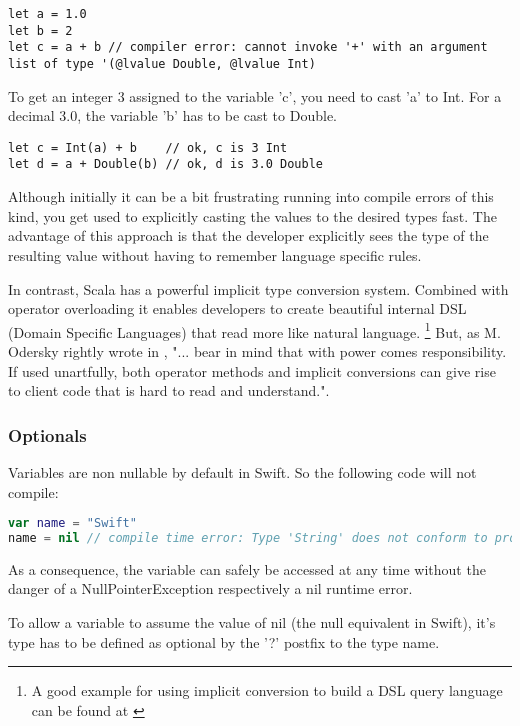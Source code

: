 \begin{lstlisting}[frame=none]
let a = 1.0
let b = 2
let c = a + b // compiler error: cannot invoke '+' with an argument list of type '(@lvalue Double, @lvalue Int)
\end{lstlisting}

To get an integer 3 assigned to the variable 'c', you need to cast 'a' to Int. For a decimal 3.0, the variable 'b' has to be cast to Double.

\begin{lstlisting}[frame=none]
let c = Int(a) + b    // ok, c is 3 Int
let d = a + Double(b) // ok, d is 3.0 Double
\end{lstlisting}

Although initially it can be a bit frustrating running into compile errors of this kind, you get used to explicitly casting the values to the desired types fast. The advantage of this approach is that the developer explicitly sees the type of the resulting value without having to remember language specific rules.

In contrast, Scala has a powerful implicit type conversion system. Combined with operator overloading it enables developers to create beautiful internal DSL (Domain Specific Languages) that read more like natural language. \footnote{A good example for using implicit conversion to build a DSL query language can be found at \cite{scala-dsl-example}}
But, as M. Odersky rightly wrote in \cite[Chapter 6.13]{scala-book}, "... bear in mind that with power comes responsibility. If used unartfully, both operator methods and implicit conversions can give rise to client code that is hard to read and understand.".

\subsubsection{Optionals}

Variables are non nullable by default in Swift. So the following code will not compile:

\begin{lstlisting}[frame=none, language=swift]
var name = "Swift"
name = nil // compile time error: Type 'String' does not conform to protocol 'NilLiteralConvertible'
\end{lstlisting}

As a consequence, the variable can safely be accessed at any time without the danger of a NullPointerException respectively a nil runtime error.

To allow a variable to assume the value of nil (the null equivalent in Swift), it's type has to be defined as optional by the '?' postfix to the type name.

